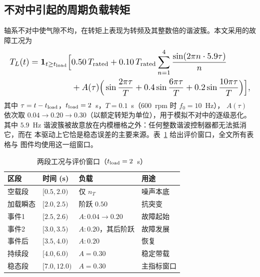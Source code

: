 \documentclass[journal]{IEEEtran}
\theoremstyle{remark}
\begin{document}
\subsection{不对中引起的周期负载转矩}
轴系不对中使气隙不均，在转矩上表现为转频及其整数倍的谐波簇。本文采用的故障工况为
\begin{equation}
\resizebox{\columnwidth}{!}{$\displaystyle
\begin{aligned}
T_L(t)=\mathbf 1_{t\ge t_{\rm load}}\Big[&0.50\,T_{\rm rated}
+0.10\,T_{\rm rated}\sum_{n=1}^{4}\frac{\sin(2\pi n\cdot 5.9\tau)}{n}\\
&+A(\tau)\Big(\sin\frac{2\pi\tau}{T}+0.4\sin\frac{6\pi\tau}{T}+0.2\sin\frac{10\pi\tau}{T}\Big)\Big],
\end{aligned}$}
\label{eq:dist}
\end{equation}
其中 $\tau=t-t_{\rm load}$，$t_{\rm load}=2$~s，$T=0.1$~s（600~rpm 时 $f_0=10$~Hz），
$A(\tau)$ 依次取 $0.04\to0.20\to0.30$（以额定转矩为单位），用于模拟不对中的逐级恶化。
其中 $5.9$~Hz 谐波簇被故意放在内模栅格之外：任何整数谐波控制器都无法抵消它，而在
本驱动上它恰是稳态误差的主要来源。表~\ref{tab:scenario} 给出评价窗口，全文所有表格与
图件均使用这一组窗口。

\begin{table}[!t]
\centering
\caption{两段工况与评价窗口（$t_{\rm load}=2$~s）}
\label{tab:scenario}
\footnotesize
\begin{tabular}{@{}llll@{}}
\toprule
区段 & 时间 (s) & 负载 & 用途\\
\midrule
空载段   & $[0.5,2.0)$  & 仅 $n_T$            & 噪声本底\\
加载瞬态 & $[2.0,2.5)$  & 阶跃 $0.50$         & 抗突变\\
事件1    & $[2.5,2.6)$  & $A:0.04\to0.20$     & 故障起始\\
事件2    & $[3.0,3.5)$  & $A:0.20$，其后阶跃   & 故障发展\\
事件后   & $[3.5,4.0)$  & $A:0.20$            & 恢复\\
持续段   & $[4.0,6.0)$  & $A=0.30$            & 稳定带载\\
稳态段   & $[7.0,12.0)$ & $A=0.30$            & 主指标窗口\\
\bottomrule
\end{tabular}
\end{table}
\end{document}
